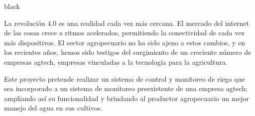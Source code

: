 \documentclass[11pt]{charter}
\begin{document}
\begin{consigna}{black}




La revolución 4.0 es una realidad cada vez más cercana. El mercado del internet de las cosas crece a ritmos acelerados, permitiendo la conectividad de cada vez más dispositivos. El sector agropecuario no ha sido ajeno a estos cambios, y en los recientes años, hemos sido testigos del surgimiento de un creciente número de empresas agtech, empresas vinculadas a la tecnología para la agricultura.

Este proyecto pretende realizar un sistema de control y monitoreo de riego que sea incorporado a un sistema de monitoreo preexistente de una empresa agtech; ampliando así su funcionalidad y brindando al productor agropecuario un mejor manejo del agua en sus cultivos. 


\end{consigna}
\end{document}
